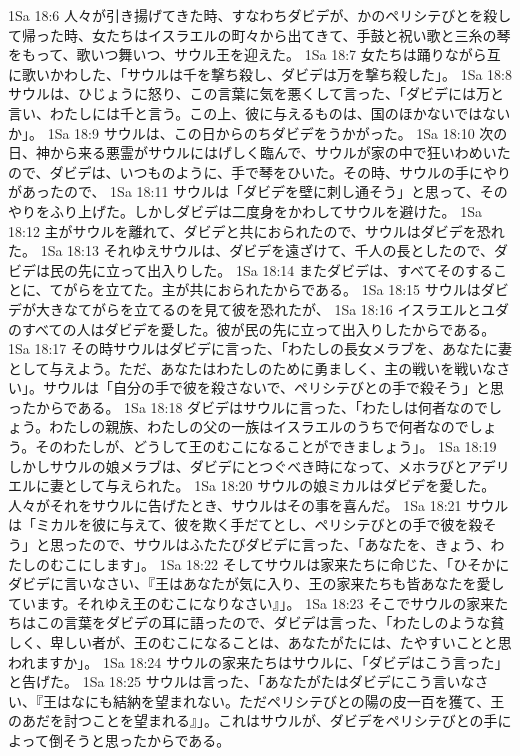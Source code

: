 1Sa 18:6  人々が引き揚げてきた時、すなわちダビデが、かのペリシテびとを殺して帰った時、女たちはイスラエルの町々から出てきて、手鼓と祝い歌と三糸の琴をもって、歌いつ舞いつ、サウル王を迎えた。
1Sa 18:7  女たちは踊りながら互に歌いかわした、「サウルは千を撃ち殺し、ダビデは万を撃ち殺した」。
1Sa 18:8  サウルは、ひじょうに怒り、この言葉に気を悪くして言った、「ダビデには万と言い、わたしには千と言う。この上、彼に与えるものは、国のほかないではないか」。
1Sa 18:9  サウルは、この日からのちダビデをうかがった。
1Sa 18:10  次の日、神から来る悪霊がサウルにはげしく臨んで、サウルが家の中で狂いわめいたので、ダビデは、いつものように、手で琴をひいた。その時、サウルの手にやりがあったので、
1Sa 18:11  サウルは「ダビデを壁に刺し通そう」と思って、そのやりをふり上げた。しかしダビデは二度身をかわしてサウルを避けた。
1Sa 18:12  主がサウルを離れて、ダビデと共におられたので、サウルはダビデを恐れた。
1Sa 18:13  それゆえサウルは、ダビデを遠ざけて、千人の長としたので、ダビデは民の先に立って出入りした。
1Sa 18:14  またダビデは、すべてそのすることに、てがらを立てた。主が共におられたからである。
1Sa 18:15  サウルはダビデが大きなてがらを立てるのを見て彼を恐れたが、
1Sa 18:16  イスラエルとユダのすべての人はダビデを愛した。彼が民の先に立って出入りしたからである。
1Sa 18:17  その時サウルはダビデに言った、「わたしの長女メラブを、あなたに妻として与えよう。ただ、あなたはわたしのために勇ましく、主の戦いを戦いなさい」。サウルは「自分の手で彼を殺さないで、ペリシテびとの手で殺そう」と思ったからである。
1Sa 18:18  ダビデはサウルに言った、「わたしは何者なのでしょう。わたしの親族、わたしの父の一族はイスラエルのうちで何者なのでしょう。そのわたしが、どうして王のむこになることができましょう」。
1Sa 18:19  しかしサウルの娘メラブは、ダビデにとつぐべき時になって、メホラびとアデリエルに妻として与えられた。
1Sa 18:20  サウルの娘ミカルはダビデを愛した。人々がそれをサウルに告げたとき、サウルはその事を喜んだ。
1Sa 18:21  サウルは「ミカルを彼に与えて、彼を欺く手だてとし、ペリシテびとの手で彼を殺そう」と思ったので、サウルはふたたびダビデに言った、「あなたを、きょう、わたしのむこにします」。
1Sa 18:22  そしてサウルは家来たちに命じた、「ひそかにダビデに言いなさい、『王はあなたが気に入り、王の家来たちも皆あなたを愛しています。それゆえ王のむこになりなさい』」。
1Sa 18:23  そこでサウルの家来たちはこの言葉をダビデの耳に語ったので、ダビデは言った、「わたしのような貧しく、卑しい者が、王のむこになることは、あなたがたには、たやすいことと思われますか」。
1Sa 18:24  サウルの家来たちはサウルに、「ダビデはこう言った」と告げた。
1Sa 18:25  サウルは言った、「あなたがたはダビデにこう言いなさい、『王はなにも結納を望まれない。ただペリシテびとの陽の皮一百を獲て、王のあだを討つことを望まれる』」。これはサウルが、ダビデをペリシテびとの手によって倒そうと思ったからである。

